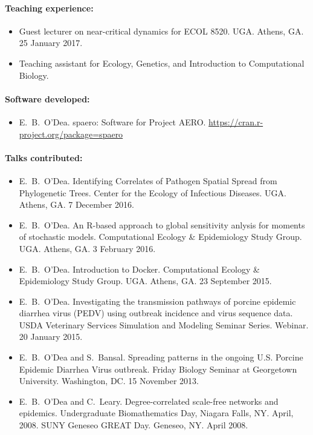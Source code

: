 \documentclass[a4paper]{article}
\begin{document}
\paragraph{Teaching experience:}

\begin{itemize}
  \item[~] Guest lecturer on near-critical dynamics for ECOL 8520. UGA. Athens, GA. 25 January 2017.
  \item[~] Teaching assistant for Ecology, Genetics, and Introduction to Computational Biology.
\end{itemize}

\paragraph{Software developed:}
\begin{itemize}
  \item[~] E.\ B.\ O'Dea. spaero: Software for Project
    AERO. \url{https://cran.r-project.org/package=spaero}
\end{itemize}

\paragraph{Talks contributed:}
\begin{itemize}
\item[~] E.\ B.\ O'Dea. Identifying Correlates of Pathogen Spatial
  Spread from Phylogenetic Trees. Center for the Ecology of Infectious
  Diseases. UGA. Athens, GA. 7 December 2016.
\item[~] E.\ B.\ O'Dea. An R-based approach to global sensitivity
  anlysis for moments of stochastic models. Computational Ecology
  \& Epidemiology Study Group. UGA. Athens, GA. 3 February 2016.
\item[~] E.\ B.\ O'Dea. Introduction to Docker. Computational Ecology
  \& Epidemiology Study Group. UGA. Athens, GA. 23 September 2015.
\item[~] E.\ B.\ O'Dea. Investigating the transmission pathways of
  porcine epidemic diarrhea virus (PEDV) using outbreak incidence and
  virus sequence data. USDA Veterinary Services Simulation and
  Modeling Seminar Series. Webinar. 20 January 2015.
\item[~] E.\ B.\ O'Dea and S.\ Bansal. Spreading patterns in the
  ongoing U.S. Porcine Epidemic Diarrhea Virus outbreak. Friday
  Biology Seminar at Georgetown University. Washington, DC. 15
  November 2013.
\item[~] E.\ B.\ O'Dea and C.\ Leary. Degree-correlated scale-free
  networks and epidemics.  Undergraduate Biomathematics Day, Niagara
  Falls, NY. April, 2008. SUNY Geneseo GREAT Day. Geneseo, NY. April
  2008.
\end{itemize}
\end{document}
